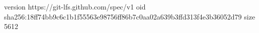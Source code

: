 version https://git-lfs.github.com/spec/v1
oid sha256:18ff74bb9c6c1b1f55563e98756ff86b7c0aa02a639b3ffd313f4e3b36052d79
size 5612
